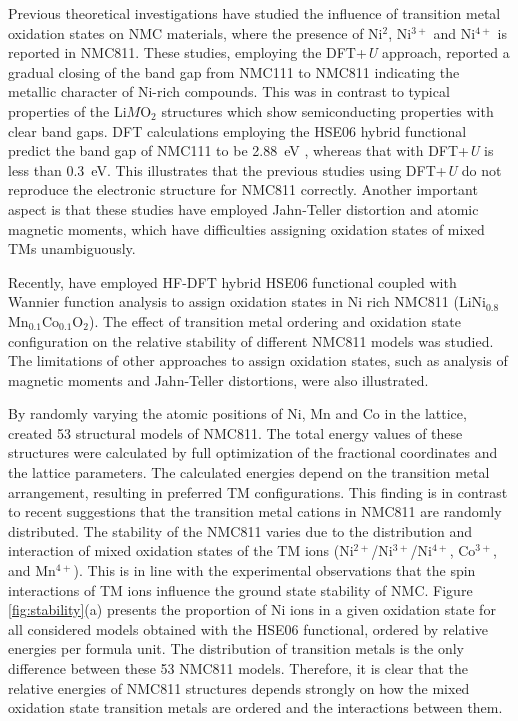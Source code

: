 \documentclass[aps,prb,twocolumn,superscriptaddress,reprint]{revtex4-1}
\newcommand{\re}[1]{\textcolor{red}{#1}}
\begin{document}
Previous theoretical investigations have studied the influence of transition metal oxidation states on NMC materials, \cite{Dan-Thomas-chemmater,Sun_JPhysChemC2017,Dixit_JPhysChemC2017,Dixit_JPhysChemC2017,Hoang_ACSChemMater2016,Dixit_JElecSoc2017} where the presence of  Ni$^{2}$, Ni$^{3+}$ and Ni$^{4+}$ is reported in NMC811. These studies, employing the DFT+\textit{U} approach, reported a gradual closing of the band gap from NMC111 to NMC811 indicating the metallic character of Ni-rich compounds. This was in contrast to typical properties of the Li$M$O$_{2}$ structures which show semiconducting properties with clear band gaps. \cite{Sun_JPhysChemC2017,Dixit_JPhysChemC2017, Hoang_ACSChemMater2016,Dixit_JElecSoc2017} DFT calculations employing the HSE06 hybrid functional predict the band gap of NMC111 to be \SI{2.88}{eV} \cite{Hoang_ACSChemMater2016}, whereas that with DFT+\textit{U} is less than \SI{0.3}{eV}.\cite{Sun_JPhysChemC2017} This illustrates that the previous studies using DFT+\textit{U} do not reproduce the electronic structure for NMC811 correctly. Another important aspect is that these studies have employed Jahn-Teller distortion and atomic magnetic moments, which have difficulties assigning oxidation states of mixed TMs unambiguously.

Recently, \re{\citeauthor{rana}} have employed HF-DFT hybrid HSE06 functional coupled with Wannier function analysis to assign oxidation states in Ni rich NMC811 (LiNi$_{0.8}$Mn$_{0.1}$Co$_{0.1}$O$_{2}$). \cite{rana} The effect of transition metal ordering and oxidation state configuration on the relative stability of different NMC811 models was studied. The limitations of other approaches to assign oxidation states, such as analysis of magnetic moments and Jahn-Teller distortions, were also illustrated.

By randomly varying the atomic positions of Ni, Mn and Co in the lattice, \re{\citeauthor{rana}} created 53 structural models of NMC811. The total energy values of these structures were calculated by full optimization of the fractional coordinates and the lattice parameters. The calculated energies depend on the transition metal arrangement, resulting in preferred TM configurations. This finding is in contrast to recent suggestions that the transition metal cations in NMC811 are randomly distributed. \cite{Sun_JPhysChemC2017} The stability of the NMC811 varies due to the distribution and interaction of mixed oxidation states of the TM ions (Ni$^{2+}$/Ni$^{3+}$/Ni$^{4+}$, Co$^{3+}$, and Mn$^{4+}$). This is in line with the experimental observations that the spin interactions of TM ions influence the ground state stability of NMC. \cite{Xiao_NanoEner2018}  Figure \ref{fig:stability}(a) presents the proportion of Ni ions in a given oxidation state for all considered models obtained with the HSE06 functional, ordered by relative energies per formula unit. \cite{rana} The distribution of transition metals is the only difference between these 53 NMC811 models. Therefore, it is clear that the relative energies of NMC811 structures depends strongly on how the mixed oxidation state transition metals are ordered and the interactions between them.
\end{document}
